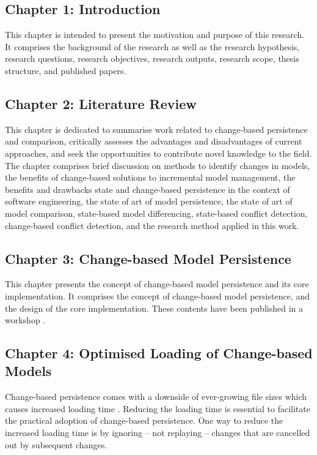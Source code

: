 \subsection{Chapter 1: Introduction}
\label{sec:chapter_1_introduction_plan}
This chapter is intended to present the motivation and purpose of this research. It comprises the background of the research as well as the research hypothesis, research questions, research objectives, research outputs, research scope, thesis structure, and published papers. 

\subsection{Chapter 2: Literature Review}
\label{sec:chapter_2_literature_review_plan}
This chapter is dedicated to summarise work related to change-based persistence and comparison, critically assesses the advantages and disadvantages of current approaches, and seek the opportunities to contribute novel knowledge to the field. The chapter comprises brief discussion on methods to identify changes in models, the benefits of change-based solutions to incremental model management, the benefits and drawbacks state and change-based persistence in the context of software engineering, the state of art of model persistence, the state of art of model comparison, state-based model differencing, state-based conflict detection, change-based conflict detection, and the research method applied in this work.

\subsection{Chapter 3: Change-based Model Persistence}
\label{sec:chapter_3_Change-based_model_ersistence_plan}
This chapter presents the concept of change-based model persistence and its core implementation. It comprises the concept of change-based model persistence, and the design of the core implementation. These contents have been published in a workshop \cite{DBLP:conf/models/YohannisKP17}.


\subsection{Chapter 4: Optimised Loading of Change-based Models}
\label{sec:chapter_4_optimised_loading_change_based_model_persistence}

Change-based persistence comes with a downside of ever-growing file sizes \cite{DBLP:journals/entcs/RobbesL07,DBLP:conf/edoc/KoegelHLHD10} which causes increased loading time \cite{mens2002state}. Reducing the loading time is essential to facilitate the practical adoption of change-based persistence. One way to reduce the increased loading time is by ignoring -- not replaying -- changes that are cancelled out by subsequent changes. 

